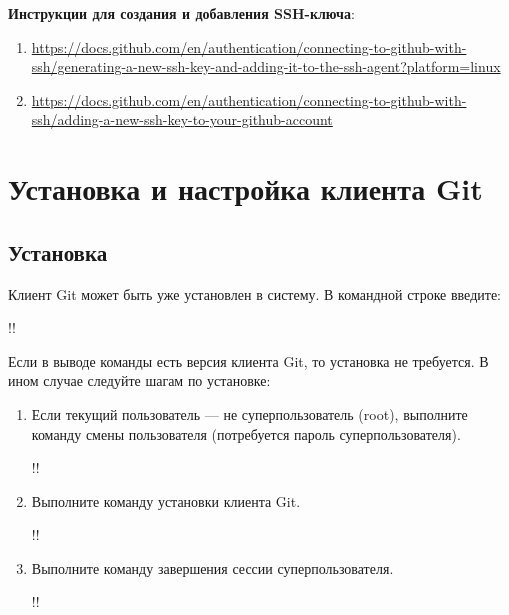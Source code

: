 \documentclass[14pt]{extarticle}
\begin{document}
        \begin{tcolorbox}
            \textbf{Инструкции для создания и добавления SSH-ключа}: \\
            \begin{enumerate}
                \item \url{https://docs.github.com/en/authentication/connecting-to-github-with-ssh/generating-a-new-ssh-key-and-adding-it-to-the-ssh-agent?platform=linux}
                \item \url{https://docs.github.com/en/authentication/connecting-to-github-with-ssh/adding-a-new-ssh-key-to-your-github-account}
            \end{enumerate}
        \end{tcolorbox}

\section{Установка и настройка клиента Git}

    \subsection{Установка}

        Клиент Git может быть уже установлен в систему.
        В командной строке введите:

        \begin{terminalwindow}
!!
        \end{terminalwindow}

        Если в выводе команды есть версия клиента Git, то установка не требуется.
        В ином случае следуйте шагам по установке:

        \begin{enumerate}

            \item Если текущий пользователь --- не суперпользователь (root),
                выполните команду смены пользователя (потребуется пароль
                суперпользователя).

                \begin{terminalwindow}
!!
                \end{terminalwindow}

            \item Выполните команду установки клиента Git.

                \begin{terminalwindow}
!!
                \end{terminalwindow}

            \item Выполните команду завершения сессии суперпользователя.

                \begin{terminalwindow}
!!
                \end{terminalwindow}

        \end{enumerate}
\end{document}

